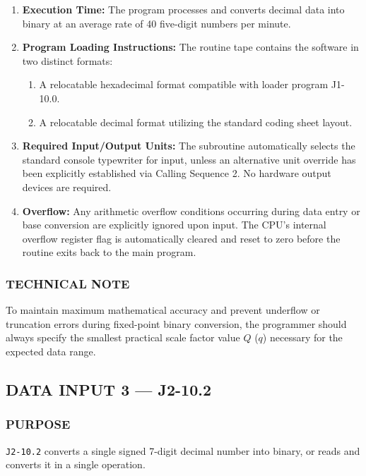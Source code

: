 \begin{enumerate}
    \item \textbf{Execution Time:} The program processes and converts decimal data into binary at an average rate of 40 five-digit numbers per minute.
    \item \textbf{Program Loading Instructions:} The routine tape contains the software in two distinct formats:
    \begin{enumerate}[label=\alph*)]
        \item A relocatable hexadecimal format compatible with loader program J1-10.0.
        \item A relocatable decimal format utilizing the standard coding sheet layout.
    \end{enumerate}
    \item \textbf{Required Input/Output Units:} The subroutine automatically selects the standard console typewriter for input, unless an alternative unit override has been explicitly established via Calling Sequence 2. No hardware output devices are required.
    \item \textbf{Overflow:} Any arithmetic overflow conditions occurring during data entry or base conversion are explicitly ignored upon input. The CPU's internal overflow register flag is automatically cleared and reset to zero before the routine exits back to the main program.
\end{enumerate}

\subsubsection*{TECHNICAL NOTE}
To maintain maximum mathematical accuracy and prevent underflow or truncation errors during fixed-point binary conversion, the programmer should always specify the smallest practical scale factor value $Q$ ($q$) necessary for the expected data range.
\newpage
\subsection*{DATA INPUT 3 --- J2-10.2}
\label{sec:data-input-3}

\subsubsection*{PURPOSE}
\texttt{J2-10.2} converts a single signed 7-digit decimal number into binary, or reads and converts it in a single operation. 

